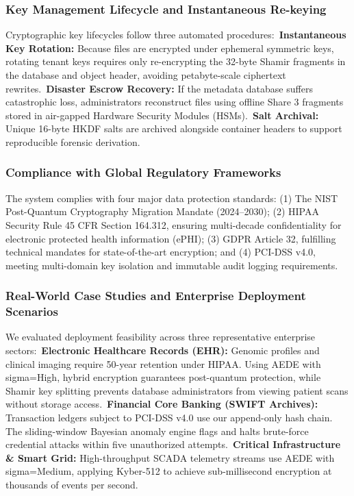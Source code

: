 \documentclass[5p,times]{elsarticle}
\begin{document}
\subsubsection{Key Management Lifecycle and Instantaneous Re-keying}

Cryptographic key lifecycles follow three automated procedures:\newline \textbullet\  \textbf{Instantaneous Key Rotation:} Because files are encrypted under ephemeral symmetric keys, rotating tenant keys requires only re-encrypting the 32-byte Shamir fragments in the database and object header, avoiding petabyte-scale ciphertext rewrites.\newline \textbullet\  \textbf{Disaster Escrow Recovery:} If the metadata database suffers catastrophic loss, administrators reconstruct files using offline Share 3 fragments stored in air-gapped Hardware Security Modules (HSMs).\newline \textbullet\  \textbf{Salt Archival:} Unique 16-byte HKDF salts are archived alongside container headers to support reproducible forensic derivation.


\subsubsection{Compliance with Global Regulatory Frameworks}

The system complies with four major data protection standards: (1) The NIST Post-Quantum Cryptography Migration Mandate (2024--2030); (2) HIPAA Security Rule 45 CFR Section 164.312, ensuring multi-decade confidentiality for electronic protected health information (ePHI); (3) GDPR Article 32, fulfilling technical mandates for state-of-the-art encryption; and (4) PCI-DSS v4.0, meeting multi-domain key isolation and immutable audit logging requirements.


\subsubsection{Real-World Case Studies and Enterprise Deployment Scenarios}

We evaluated deployment feasibility across three representative enterprise sectors:\newline \textbullet\  \textbf{Electronic Healthcare Records (EHR):} Genomic profiles and clinical imaging require 50-year retention under HIPAA. Using AEDE with sigma=High, hybrid encryption guarantees post-quantum protection, while Shamir key splitting prevents database administrators from viewing patient scans without storage access.\newline \textbullet\  \textbf{Financial Core Banking (SWIFT Archives):} Transaction ledgers subject to PCI-DSS v4.0 use our append-only hash chain. The sliding-window Bayesian anomaly engine flags and halts brute-force credential attacks within five unauthorized attempts.\newline \textbullet\  \textbf{Critical Infrastructure \& Smart Grid:} High-throughput SCADA telemetry streams use AEDE with sigma=Medium, applying Kyber-512 to achieve sub-millisecond encryption at thousands of events per second.
\end{document}
